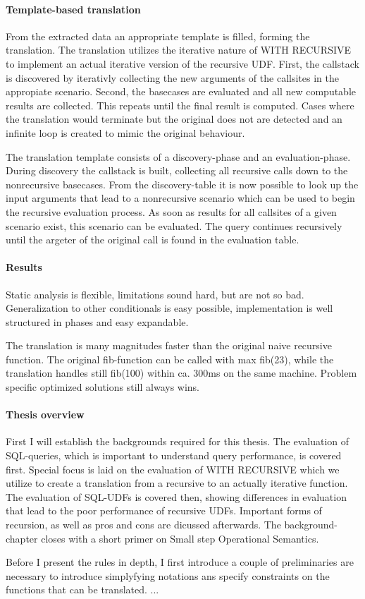 \paragraph*{Template-based translation}
From the extracted data an appropriate template is filled, forming the translation. The translation utilizes the iterative nature of WITH RECURSIVE to implement an actual iterative version of the recursive UDF. First, the callstack is discovered by iterativly collecting the new arguments of the callsites in the appropiate scenario. Second, the basecases are evaluated and all new computable results are collected. This repeats until the final result is computed. Cases where the translation would terminate but the original does not are detected and an infinite loop is created to mimic the original behaviour.

The translation template consists of a discovery-phase and an evaluation-phase. During discovery the callstack is built, collecting all recursive calls down to the nonrecursive basecases. From the discovery-table it is now possible to look up the input arguments that lead to a nonrecursive scenario which can be used to begin the recursive evaluation process. As soon as results for all callsites of a given scenario exist, this scenario can be evaluated. The query continues recursively until the argeter of the original call is found in the evaluation table.
    

\paragraph*{Results}
Static analysis is flexible, limitations sound hard, but are not so bad. Generalization to other conditionals is easy possible, implementation is well structured in phases and easy expandable.

The translation is many magnitudes faster than the original naive recursive function. The original fib-function can be called with max fib(23), while the translation handles still fib(100) within ca. 300ms on the same machine. Problem specific optimized solutions still always wins.

\paragraph*{Thesis overview}
First I will establish the backgrounds required for this thesis. The evaluation of SQL-queries, which is important to understand query performance, is covered first. Special focus is laid on the evaluation of WITH RECURSIVE which we utilize to create a translation from a recursive to an actually iterative function. The evaluation of SQL-UDFs is covered then, showing differences in evaluation that lead to the poor performance of recursive UDFs. Important forms of recursion, as well as pros and cons are dicussed afterwards. The background-chapter closes with a short primer on Small step Operational Semantics.

Before I present the rules in depth, I first introduce a couple of preliminaries are necessary to introduce simplyfying notations ans specify constraints on the functions that can be translated.
...